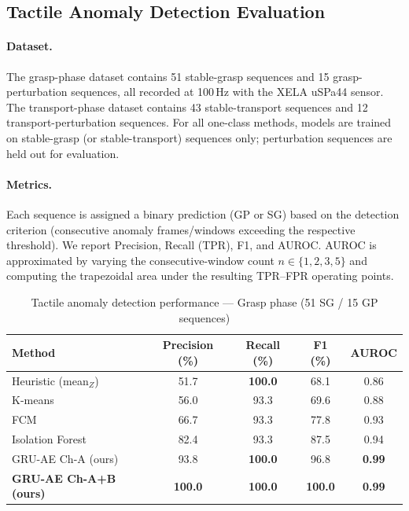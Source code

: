\documentclass[pdflatex,sn-mathphys-num]{sn-jnl}%
\theoremstyle{thmstyleone}%
\theoremstyle{thmstyletwo}%
\theoremstyle{thmstylethree}%
\begin{document}
\subsection{Tactile Anomaly Detection Evaluation}
\label{sec:tactile_eval}

\paragraph{Dataset.}
The grasp-phase dataset contains 51 stable-grasp sequences and 15 grasp-perturbation sequences, all recorded at 100\,Hz with the XELA uSPa44 sensor. The transport-phase dataset contains 43 stable-transport sequences and 12 transport-perturbation sequences. For all one-class methods, models are trained on stable-grasp (or stable-transport) sequences only; perturbation sequences are held out for evaluation.

\paragraph{Metrics.}
Each sequence is assigned a binary prediction (GP or SG) based on the detection criterion (consecutive anomaly frames/windows exceeding the respective threshold). We report Precision, Recall (TPR), F1, and AUROC. AUROC is approximated by varying the consecutive-window count $n \in \{1, 2, 3, 5\}$ and computing the trapezoidal area under the resulting TPR–FPR operating points.

\begin{table}[h]
\caption{Tactile anomaly detection performance — Grasp phase (51 SG / 15 GP sequences)}
\label{tab:tactile_eval_grasp}
\centering
\begin{tabular}{lcccc}
\hline
Method & Precision (\%) & Recall (\%) & F1 (\%) & AUROC \\
\hline
Heuristic (mean$_Z$)    & 51.7 & \textbf{100.0} & 68.1 & 0.86 \\
K-means                 & 56.0 & 93.3           & 69.6 & 0.88 \\
FCM                     & 66.7 & 93.3           & 77.8 & 0.93 \\
Isolation Forest        & 82.4 & 93.3           & 87.5 & 0.94 \\
GRU-AE Ch-A (ours)      & 93.8 & \textbf{100.0} & 96.8 & \textbf{0.99} \\
\textbf{GRU-AE Ch-A+B (ours)} & \textbf{100.0} & \textbf{100.0} & \textbf{100.0} & \textbf{0.99} \\
\hline
\end{tabular}
\end{table}
\end{document}
